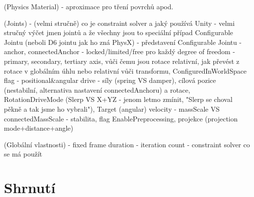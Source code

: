 (Physics Material)
- aproximace pro tření povrchů apod.

(Joints)
- (velmi stručně) co je constraint solver a jaký používá Unity
- velmi stručný výčet jmen jointů a že všechny jsou to speciální případ Configurable Jointu (neboli D6 jointu jak ho zná PhysX)
- představení Configurable Jointu
    - anchor, connectedAnchor
    - locked/limited/free pro každý degree of freedom
    - primary, secondary, tertiary axis, vůči čemu jsou rotace relativní, jak převést z rotace v globálním úhlu nebo relativní vůči transformu, ConfiguredInWorldSpace flag
    - positional\&angular drive - síly (spring VS damper), cílová pozice (nestabilní, alternativa nastavení connectedAnchoru) a rotace, RotationDriveMode (Slerp VS X+YZ - jenom letmo zmínit, "Slerp se choval pěkně a tak jsme ho vybrali"), Target (angular) velocity
    - massScale VS connectedMassScale
    - stabilita, flag EnablePreprocessing, projekce (projection mode+distance+angle)

(Globální vlastnosti)
- fixed frame duration
- iteration count
- constraint solver co se má použít


\section{Shrnutí}